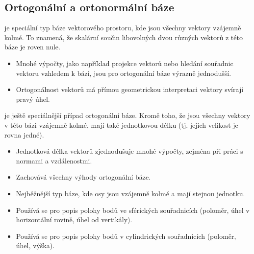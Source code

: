 \documentclass[letterpaper,10pt,english]{jupyterBook}
\begin{document}
\subsection{Ortogonální a ortonormální báze}
\label{\detokenize{Prednasky/0_3_Sou_u0159adnicov_xe9_syst_xe9my:ortogonalni-a-ortonormalni-baze}}
\sphinxAtStartPar
{} je speciální typ báze vektorového prostoru, kde jsou všechny vektory vzájemně kolmé. To znamená, že skalární součin libovolných dvou různých vektorů z této báze je roven nule.

\sphinxAtStartPar
{}
\begin{itemize}
\item {} 
\sphinxAtStartPar
{} Mnohé výpočty, jako například projekce vektorů nebo hledání souřadnic vektoru vzhledem k bázi, jsou pro ortogonální báze výrazně jednodušší.

\item {} 
\sphinxAtStartPar
{} Ortogonálnost vektorů má přímou geometrickou interpretaci \sphinxhyphen{} vektory svírají pravý úhel.

\end{itemize}

\sphinxAtStartPar
{} je ještě speciálnější případ ortogonální báze. Kromě toho, že jsou všechny vektory v této bázi vzájemně kolmé, mají také jednotkovou délku (tj. jejich velikost je rovna jedné).

\sphinxAtStartPar
{}
\begin{itemize}
\item {} 
\sphinxAtStartPar
{} Jednotková délka vektorů zjednodušuje mnohé výpočty, zejména při práci s normami a vzdálenostmi.

\item {} 
\sphinxAtStartPar
{} Zachovává všechny výhody ortogonální báze.

\end{itemize}

\sphinxAtStartPar
{}
\begin{itemize}
\item {} 
\sphinxAtStartPar
{} Nejběžnější typ báze, kde osy jsou vzájemně kolmé a mají stejnou jednotku.

\item {} 
\sphinxAtStartPar
{} Používá se pro popis polohy bodů ve sférických souřadnicích (poloměr, úhel v horizontální rovině, úhel od vertikály).

\item {} 
\sphinxAtStartPar
{} Používá se pro popis polohy bodů v cylindrických souřadnicích (poloměr, úhel, výška).

\end{itemize}
\end{document}
